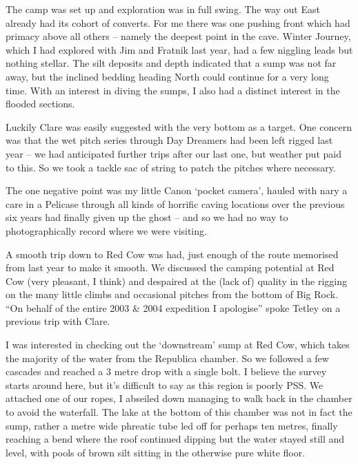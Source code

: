 The camp was set up and exploration was in full swing. The way out East
already had its cohort of converts. For me there was one pushing front
which had primacy above all others -- namely the deepest point in the
cave. Winter Journey, which I had explored with Jim and Fratnik last
year, had a few niggling leads but nothing stellar. The silt deposits
and depth indicated that a sump was not far away, but the inclined
bedding heading North could continue for a very long time. With an
interest in diving the sumps, I also had a distinct interest in the
flooded sections.

Luckily Clare was easily suggested with the very bottom as a target. One
concern was that the wet pitch series through Day Dreamers had been left
rigged last year -- we had anticipated further trips after our last one,
but weather put paid to this. So we took a tackle sac of string to patch
the pitches where necessary.

The one negative point was my little Canon `pocket camera', hauled with
nary a care in a Pelicase through all kinds of horrific caving locations
over the previous six years had finally given up the ghost -- and so we
had no way to photographically record where we were visiting.

A smooth trip down to Red Cow was had, just enough of the route
memorised from last year to make it smooth. We discussed the camping
potential at Red Cow (very pleasant, I think) and despaired at the (lack
of) quality in the rigging on the many little climbs and occasional
pitches from the bottom of Big Rock. ``On behalf of the entire 2003 \&
2004 expedition I apologise'' spoke Tetley on a previous trip with
Clare.

I was interested in checking out the `downstream' sump at Red Cow, which
takes the majority of the water from the Republica chamber. So we
followed a few cascades and reached a 3 metre drop with a single bolt. I
believe the survey starts around here, but it's difficult to say as this
region is poorly PSS. We attached one of our ropes, I abseiled down
managing to walk back in the chamber to avoid the waterfall. The lake at
the bottom of this chamber was not in fact the sump, rather a metre wide
phreatic tube led off for perhaps ten metres, finally reaching a bend
where the roof continued dipping but the water stayed still and level,
with pools of brown silt sitting in the otherwise pure white floor.

